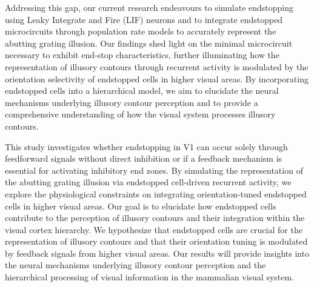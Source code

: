 \documentclass[12pt]{article}
\begin{document}
\noindent Addressing this gap, our current research endeavours to simulate endstopping using Leaky Integrate and Fire (LIF) neurons and to integrate endstopped microcircuits through population rate models to accurately represent the abutting grating illusion. Our findings shed light on the minimal microcircuit necessary to exhibit end-stop characteristics, further illuminating how the representation of illusory contours through recurrent activity is modulated by the orientation selectivity of endstopped cells in higher visual areas. By incorporating endstopped cells into a hierarchical model, we aim to elucidate the neural mechanisms underlying illusory contour perception and to provide a comprehensive understanding of how the visual system processes illusory contours.

\noindent This study investigates whether endstopping in V1 can occur solely through feedforward signals without direct inhibition or if a feedback mechanism is essential for activating inhibitory end zones. By simulating the representation of the abutting grating illusion via endstopped cell-driven recurrent activity, we explore the physiological constraints on integrating orientation-tuned endstopped cells in higher visual areas. Our goal is to elucidate how endstopped cells contribute to the perception of illusory contours and their integration within the visual cortex hierarchy. We hypothesize that endstopped cells are crucial for the representation of illusory contours and that their orientation tuning is modulated by feedback signals from higher visual areas. Our results will provide insights into the neural mechanisms underlying illusory contour perception and the hierarchical processing of visual information in the mammalian visual system.

\newpage
\end{document}
